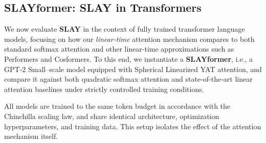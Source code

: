 \documentclass{article}
\begin{document}
\subsection{SLAYformer: SLAY in Transformers}
\label{subsec:slayformer}

We now evaluate \textbf{SLAY} in the context of fully trained transformer language models, focusing on how our
\emph{linear‑time} attention mechanism compares to both standard softmax attention and other linear-time approximations such as Performers and Cosformers.
To this end, we instantiate a \textbf{SLAYformer}, i.e., a GPT‑2 Small–scale model equipped with Spherical
Linearized YAT attention, and compare it against both quadratic softmax attention and state‑of‑the‑art
linear attention baselines under strictly controlled training conditions.

All models are trained to the same token budget in accordance with the Chinchilla scaling law, and share
identical architecture, optimization hyperparameters, and training data. This setup isolates the effect
of the attention mechanism itself.
\begin{table}[htbp]
\centering
\small
\caption{\small{
Validation performance comparison of attention mechanisms after satisfying the Chinchilla scaling law. Full model details available in Appendix \ref{app:experiments}.
}}
\label{tab:attention-val-comparison}
\end{table}
\end{document}
